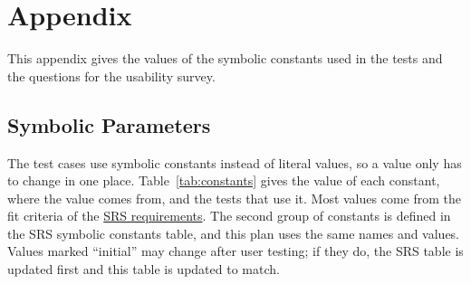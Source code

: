 \documentclass[12pt, titlepage]{article}
\begin{document}




\newpage

\section{Appendix}

This appendix gives the values of the symbolic constants used in the tests and
the questions for the usability survey.

\subsection{Symbolic Parameters}

The test cases use symbolic constants instead of literal values, so a value
only has to change in one place. Table~\ref{tab:constants} gives the value of
each constant, where the value comes from, and the tests that use it. Most
values come from the fit criteria of the \href{https://github.com/arjunkarthik123/fitness-finance-application/blob/main/pdfs/SRS-Volere/SRS.pdf}{SRS requirements}. The
second group of constants is defined in the SRS symbolic constants table, and
this plan uses the same names and values. Values marked ``initial'' may change
after user testing; if they do, the SRS table is updated first and this table
is updated to match.
\end{document}
